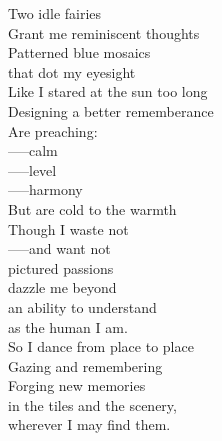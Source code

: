 Two idle fairies\\
Grant me reminiscent thoughts\\
Patterned blue mosaics\\
that dot my eyesight\\
Like I stared at the sun too long\\
Designing a better rememberance\\
Are preaching:\\
-----calm\\
-----level\\
-----harmony\\
But are cold to the warmth\\
Though I waste not\\
-----and want not\\
pictured passions\\
dazzle me beyond\\
an ability to understand\\
as the human I am.\\
So I dance from place to place\\
Gazing and remembering\\
Forging new memories\\
in the tiles and the scenery,\\
wherever I may find them.\\

